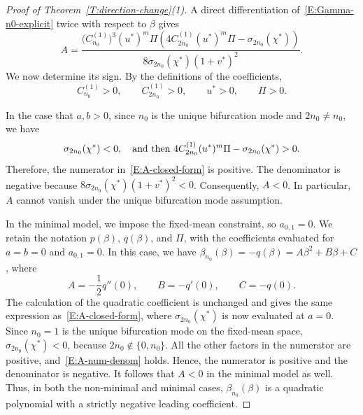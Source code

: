 \documentclass[11pt]{article} %
\theoremstyle{remark}
\theoremstyle{remark}
\numberwithin{equation}{section}
\numberwithin{figure}{section}
\numberwithin{table}{section}
\begin{document}
\begin{proof} [Proof of Theorem~\ref{T:direction-change}(1)]
  A direct differentiation of~\eqref{E:Gamma-n0-explicit} twice with respect to
  $\beta$ gives
  \begin{equation}\label{E:A-closed-form}
    A
    =
    \frac{
    \bigl(C_{n_0}^{(1)}\bigr)^3
    (u^*)^m\Pi
    \left(
    4C_{2n_0}^{(1)}(u^*)^m\Pi
    -\sigma_{2n_0}(\chi^*)
    \right)
    }{
    8\sigma_{2n_0}(\chi^*)(1+v^*)^2
    }.
  \end{equation}
  We now determine its sign. By the definitions of the coefficients,
  \[
    C_{n_0}^{(1)}>0,\qquad
    C_{2n_0}^{(1)}>0,\qquad
    u^*>0,\qquad
    \Pi>0.
  \]

  In the case that $a, b > 0$, since $n_0$ is the unique bifurcation mode and
  $2n_0 \ne n_0$, we have
  \begin{equation}\label{E:A-num-denom}
    \sigma_{2n_0}(\chi^*)<0, \quad {\rm and\,\, then}\,\,
    4C_{2n_0}^{(1)}(u^*)^m\Pi
    -\sigma_{2n_0}(\chi^*)>0.
  \end{equation}
  Therefore, the numerator in~\eqref{E:A-closed-form} is positive. The
  denominator is negative because $ 8\sigma_{2n_0}(\chi^*)(1 + v^*)^2 < 0$.
  Consequently, $A < 0$. In particular, $A$ cannot vanish under the unique
  bifurcation mode assumption.


  In the minimal model, we impose the fixed-mean constraint, so $a_{0,1} = 0$.
  We retain the notation $p(\beta)$, $q(\beta)$, and $\Pi$, with the
  coefficients evaluated for $a = b = 0$ and $a_{0,1} = 0$. In this case, we
  have $\beta_{n_0}(\beta) = -q(\beta) = A\beta^2 + B\beta + C$, where
  \[
    A=-\frac12q''(0),
    \qquad
    B=-q'(0),
    \qquad
    C=-q(0).
  \]
  The calculation of the quadratic coefficient is unchanged and gives the same
  expression as~\eqref{E:A-closed-form}, where $\sigma_{2n_0}(\chi^*)$ is now
  evaluated at $a = 0$. Since $n_0 = 1$ is the unique bifurcation mode on the
  fixed-mean space, $\sigma_{2n_0}(\chi^*) < 0$, because $2n_0 \notin \{0,
  n_0\}$. All the other factors in the numerator are positive,
  and~\eqref{E:A-num-denom} holds. Hence, the numerator is positive and the
  denominator is negative. It follows that $A < 0$ in the minimal model as
  well. Thus, in both the non-minimal and minimal cases, $\beta_{n_0}(\beta)$
  is a quadratic polynomial with a strictly negative leading coefficient.



\end{proof}
\end{document}
